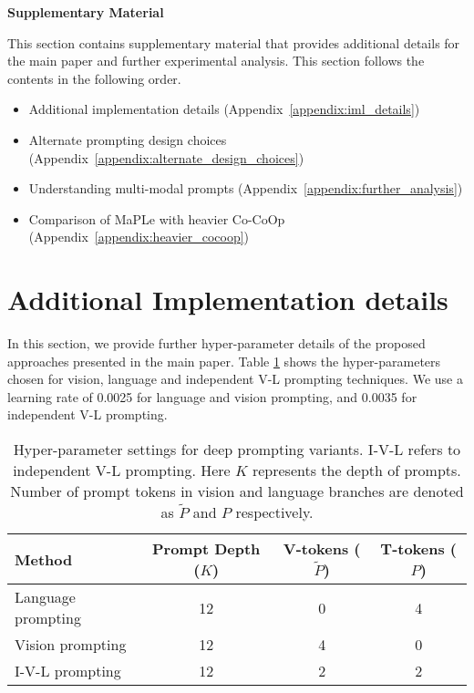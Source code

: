 \documentclass[10pt,twocolumn,letterpaper]{article}
\newcommand{\tablestyle}[2]{\setlength{\tabcolsep}{#1}\renewcommand{\arraystretch}{#2}\centering\footnotesize}
\begin{document}
{\small


}


\newpage
\newpage
\appendix


\begin{center}
\textbf{\Large Supplementary Material}
\end{center}

 \noindent This section contains supplementary material that provides additional details for the main paper and further experimental analysis. This section follows the contents in the following order.
\begin{itemize}
    \item Additional implementation details (Appendix~\ref{appendix:iml_details})
    \item Alternate prompting design choices (Appendix~\ref{appendix:alternate_design_choices})
    \item Understanding multi-modal prompts (Appendix~\ref{appendix:further_analysis})

\item Comparison of MaPLe with heavier Co-CoOp (Appendix~\ref{appendix:heavier_cocoop})
\end{itemize}


\section{Additional Implementation details}
 \noindent In this section, we provide further hyper-parameter details of the proposed approaches presented in the main paper. Table \ref{table:hyper_parameter} shows the hyper-parameters chosen for vision, language and independent V-L prompting techniques. We use a learning rate of 0.0025 for language and vision prompting, and 0.0035 for independent V-L prompting.
\label{appendix:iml_details}


\begin{table}[h!]
\tablestyle{6pt}{1.1}
\addtolength{\tabcolsep}{-3pt}
\begin{tabular}{l ccc}
\toprule
Method  & Prompt Depth ($K$) & V-tokens ($\tilde{P}$) & T-tokens ($P$)\\
\midrule
Language prompting &	12 & 0 &	4\\
Vision prompting & 12 & 4 & 0\\
I-V-L prompting & 12 & 2 & 2\\
\bottomrule
\end{tabular}
\caption{
Hyper-parameter settings for deep prompting variants. I-V-L refers to independent V-L prompting. Here $K$ represents the depth of prompts. Number of prompt tokens in vision and language branches are denoted as $\tilde{P}$ and $P$ respectively.
} 
\label{table:hyper_parameter}
\end{table}
\end{document}
